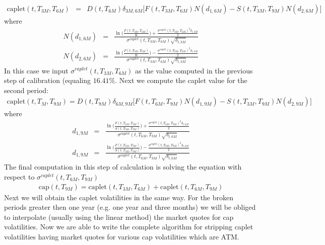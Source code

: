 \documentclass[11pt]{article}
\numberwithin{equation}{subsection}
\begin{document}
\begin{eqnarray*}
	\text{caplet}(t, T_{3M}, T_{6M}) &=& D(t, T_{6M}) \delta_{3M,6M} \big[ F(t, T_{3M}, T_{6M}) N(d_{1,6M})
	- S(t, T_{3M}, T_{9M})N(d_{2,6M}) \big]
\end{eqnarray*}
where 
\begin{eqnarray*}
	N(d_{1,6M})&=&\frac{\ln\Big(\frac{F(t, T_{3M}, T_{6M})}{K}\Big) + \frac{\sigma^{caplet}(t, T_{3M}, T_{6M})^2\delta_{t, 3M}}{2}}{\sigma^{caplet}(t, T_{3M}, T_{6M})\sqrt{\delta_{t,3M}}}
\end{eqnarray*}
\begin{eqnarray*}
	N(d_{2,6M})&=&\frac{\ln\Big(\frac{F(t, T_{3M}, T_{6M})}{K}\Big) - \frac{\sigma^{caplet}(t, T_{3M}, T_{6M})^2\delta_{t, 3M}}{2}}{\sigma^{caplet}(t, T_{3M}, T_{6M})\sqrt{\delta_{t,3M}}}
\end{eqnarray*}
In this case we input \(\sigma^{caplet}(t, T_{3M}, T_{6M})\) as the value computed in the previous step of calibration (equaling \(16.41\%\). Next we compute the caplet value for the second period:
\begin{eqnarray*}
	\text{caplet}(t, T_{M}, T_{9M}) = D(t, T_{9M}) \delta_{6M,9M} \big[F(t, T_{6M}, T_{9M}) N(d_{1,9M}) -  S(t, T_{3M}, T_{9M})N(d_{2,9M}) \big]
\end{eqnarray*}
where 
\begin{eqnarray*}
	d_{1,9M}&=&\frac{\ln\Big(\frac{F(t, T_{6M}, T_{9M})}{S(t, T_{3M}, T_{9M})}\Big) + \frac{\sigma^{caplet}(t, T_{6M}, T_{9M})^2 \delta_{t, 6M}}{2}}{\sigma^{caplet}(t, T_{6M}, T_{9M})\sqrt{\delta_{t,6M}}}
\end{eqnarray*}
\begin{eqnarray*}
	d_{1,9M}&=&\frac{\ln\Big(\frac{F(t, T_{6M}, T_{9M})}{S(t, T_{3M}, T_{9M})}\Big) - \frac{\sigma^{caplet}(t, T_{6M}, T_{9M})^2 \delta_{t, 6M}}{2}}{\sigma^{caplet}(t, T_{6M}, T_{9M})\sqrt{\delta_{t,6M}}}
\end{eqnarray*}
The final computation in this step of calculation is solving the equation with respect to \(\sigma^{caplet}(t, T_{6M}, T_{9M})\)
\begin{eqnarray*}
	\text{cap}(t, T_{9M}) = \text{caplet}(t, T_{3M}, T_{6M}) + \text{caplet}(t, T_{6M}, T_{9M})
\end{eqnarray*}
Next we will obtain the caplet volatilities in the same way. For the broken periods greater
then one year (e.g. one year and three months) we will be obliged to interpolate (usually
using the linear method) the market quotes for cap volatilities.
Now we are able to write the complete algorithm for stripping caplet volatilities having
market quotes for various cap volatilities which are ATM.
\end{document}
